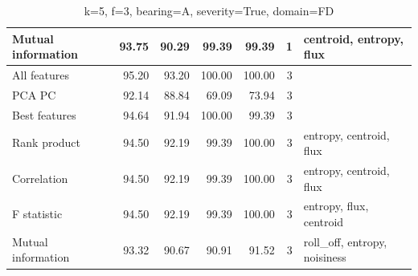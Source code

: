 \begin{table}[h]
\begin{adjustbox}{width=\textwidth}
\begin{tabular}{|l|rr|rr|r|l|}
Mutual information                    & \multicolumn{1}{r|}{93.75}          & 90.29                              & \multicolumn{1}{r|}{99.39}          & 99.39                              & 1                                                   & centroid, entropy, flux                 \\ \hline
All features                          & \multicolumn{1}{r|}{95.20}          & 93.20                              & \multicolumn{1}{r|}{100.00}         & 100.00                             & 3                                                   &                                         \\ \hline
PCA PC                                & \multicolumn{1}{r|}{92.14}          & 88.84                              & \multicolumn{1}{r|}{69.09}          & 73.94                              & 3                                                   &                                         \\ \hline
Best features                         & \multicolumn{1}{r|}{94.64}          & 91.94                              & \multicolumn{1}{r|}{100.00}         & 99.39                              & 3                                                   &                                         \\ \hline
Rank product                          & \multicolumn{1}{r|}{94.50}          & 92.19                              & \multicolumn{1}{r|}{99.39}          & 100.00                             & 3                                                   & entropy, centroid, flux                 \\ \hline
Correlation                           & \multicolumn{1}{r|}{94.50}          & 92.19                              & \multicolumn{1}{r|}{99.39}          & 100.00                             & 3                                                   & entropy, centroid, flux                 \\ \hline
F statistic                           & \multicolumn{1}{r|}{94.50}          & 92.19                              & \multicolumn{1}{r|}{99.39}          & 100.00                             & 3                                                   & entropy, flux, centroid                 \\ \hline
Mutual information                    & \multicolumn{1}{r|}{93.32}          & 90.67                              & \multicolumn{1}{r|}{90.91}          & 91.52                              & 3                                                   & roll\_off, entropy, noisiness           \\ \hline
\end{tabular}
\end{adjustbox}
\caption{k=5, f=3, bearing=A, severity=True, domain=FD}
\end{table}




